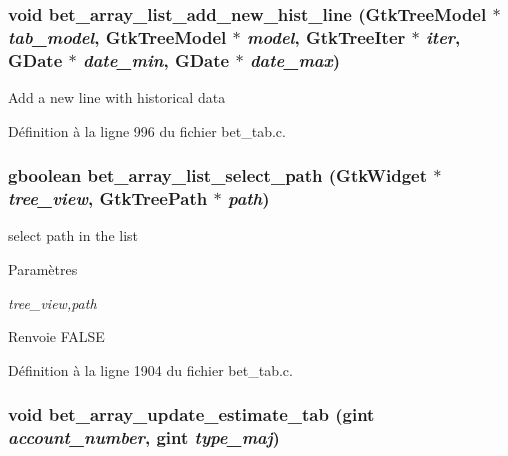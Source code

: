 \subsubsection[{bet\_\-array\_\-list\_\-add\_\-new\_\-hist\_\-line}]{\setlength{\rightskip}{0pt plus 5cm}void bet\_\-array\_\-list\_\-add\_\-new\_\-hist\_\-line (GtkTreeModel $\ast$ {\em tab\_\-model}, \/  GtkTreeModel $\ast$ {\em model}, \/  GtkTreeIter $\ast$ {\em iter}, \/  GDate $\ast$ {\em date\_\-min}, \/  GDate $\ast$ {\em date\_\-max})}\label{bet__tab_8c_a06cdcd05c5db9dec496f47a99b7eaca5}
Add a new line with historical data 

Définition à la ligne 996 du fichier bet\_\-tab.c.

\subsubsection[{bet\_\-array\_\-list\_\-select\_\-path}]{\setlength{\rightskip}{0pt plus 5cm}gboolean bet\_\-array\_\-list\_\-select\_\-path (GtkWidget $\ast$ {\em tree\_\-view}, \/  GtkTreePath $\ast$ {\em path})}\label{bet__tab_8c_ad6a44874943998f49cc24bda305c961b}
select path in the list


\begin{DoxyParams}{Paramètres}
\item[{\em tree\_\-view,path}]\end{DoxyParams}
\begin{DoxyReturn}{Renvoie}
FALSE 
\end{DoxyReturn}


Définition à la ligne 1904 du fichier bet\_\-tab.c.

\subsubsection[{bet\_\-array\_\-update\_\-estimate\_\-tab}]{\setlength{\rightskip}{0pt plus 5cm}void bet\_\-array\_\-update\_\-estimate\_\-tab (gint {\em account\_\-number}, \/  gint {\em type\_\-maj})}\label{bet__tab_8c_a333b7b726d6915f02a6a8bb93365046b}


